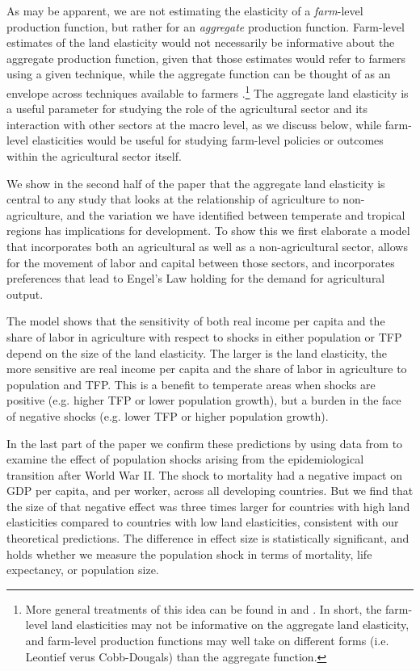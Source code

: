 \documentclass[11pt]{article}
\begin{document}
As may be apparent, we are not estimating the elasticity of a \textit{farm}-level production function, but rather for an \textit{aggregate} production function. Farm-level estimates of the land elasticity would not necessarily be informative about the aggregate production function, given that those estimates would refer to farmers using a given technique, while the aggregate function can be thought of as an envelope across techniques available to farmers \citep{Hayami:1970ly}.\footnote{More general treatments of this idea can be found in \citet{houthakker1955} and \citet{jones2005}. In short, the farm-level land elasticities may not be informative on the aggregate land elasticity, and farm-level production functions may well take on different forms (i.e. Leontief verus Cobb-Dougals) than the aggregate function.} The aggregate land elasticity is a useful parameter for studying the role of the agricultural sector and its interaction with other sectors at the macro level, as we discuss below, while farm-level elasticities would be useful for studying farm-level policies or outcomes within the agricultural sector itself.

We show in the second half of the paper that the aggregate land elasticity is central to any study that looks at the relationship of agriculture to non-agriculture, and the variation we have identified between temperate and tropical regions has implications for development. To show this we first elaborate a model that incorporates both an agricultural as well as a non-agricultural sector, allows for the movement of labor and capital between those sectors, and incorporates preferences that lead to Engel's Law holding for the demand for agricultural output. 

The model shows that the sensitivity of both real income per capita and the share of labor in agriculture with respect to shocks in either population or TFP depend on the size of the land elasticity. The larger is the land elasticity, the more sensitive are real income per capita and the share of labor in agriculture to population and TFP. This is a benefit to temperate areas when shocks are positive (e.g. higher TFP or lower population growth), but a burden in the face of negative shocks (e.g. lower TFP or higher population growth).

In the last part of the paper we confirm these predictions by using data from \cite{aj07} to examine the effect of population shocks arising from the epidemiological transition after World War II. The shock to mortality had a negative impact on GDP per capita, and per worker, across all developing countries. But we find that the size of that negative effect was three times larger for countries with high land elasticities compared to countries with low land elasticities, consistent with our theoretical predictions. The difference in effect size is statistically significant, and holds whether we measure the population shock in terms of mortality, life expectancy, or population size.
\end{document}
